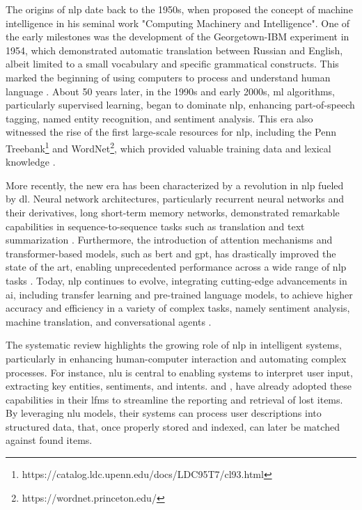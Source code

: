 The origins of \ac{nlp} date back to the 1950s, when  proposed the concept of machine intelligence in his seminal work "Computing Machinery and Intelligence". One of the early milestones was the development of the Georgetown-IBM experiment in 1954, which demonstrated automatic translation between Russian and English, albeit limited to a small vocabulary and specific grammatical constructs. This marked the beginning of using computers to process and understand human language \cite{Hutchins2004}. About 50 years later, in the 1990s and early 2000s, \ac{ml} algorithms, particularly supervised learning, began to dominate \ac{nlp}, enhancing part-of-speech tagging, named entity recognition, and sentiment analysis. This era also witnessed the rise of the first large-scale resources for \ac{nlp}, including the Penn Treebank\footnote{https://catalog.ldc.upenn.edu/docs/LDC95T7/cl93.html} and WordNet\footnote{https://wordnet.princeton.edu/}, which provided valuable training data and lexical knowledge \cite{Marcus1993, Fellbaum1998}.

More recently, the new era has been characterized by a revolution in \ac{nlp} fueled by \ac{dl}. Neural network architectures, particularly recurrent neural networks and their derivatives, long short-term memory networks, demonstrated remarkable capabilities in sequence-to-sequence tasks such as translation and text summarization \cite{Bahdanau2015}. Furthermore, the introduction of attention mechanisms and transformer-based models, such as \ac{bert} and \ac{gpt}, has drastically improved the state of the art, enabling unprecedented performance across a wide range of \ac{nlp} tasks \cite{Vaswani2017, Devlin2019}. Today, \ac{nlp} continues to evolve, integrating cutting-edge advancements in \ac{ai}, including transfer learning and pre-trained language models, to achieve higher accuracy and efficiency in a variety of complex tasks, namely sentiment analysis, machine translation, and conversational agents \cite{Howard2018}.

The systematic review highlights the growing role of \ac{nlp} in intelligent systems, particularly in enhancing human-computer interaction and automating complex processes. For instance, \ac{nlu} is central to enabling systems to interpret user input, extracting key entities, sentiments, and intents.  and , have already adopted these capabilities in their \ac{lfms} to streamline the reporting and retrieval of lost items. By leveraging \ac{nlu} models, their systems can process user descriptions into structured data, that, once properly stored and indexed, can later be matched against found items.

